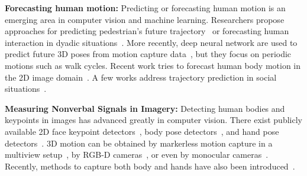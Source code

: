 \textbf{Forecasting human motion:}
Predicting or forecasting human motion is an emerging area in computer vision and machine learning. Researchers propose approaches for predicting pedestrian's future trajectory~\cite{kitani2012activity} or forecasting human interaction in dyadic situations~\cite{huang2014action}. More recently, deep neural network are used to predict future 3D poses from motion capture data~\cite{mnih2012conditional, Fragkiadaki_2015_ICCV, jain2016structural}, but they focus on periodic motions such as walk cycles. Recent work tries to forecast human body motion in the 2D image domain~\cite{walker2016uncertain, villegas2017learning}. A few works address trajectory prediction in social situations~\cite{helbing1995social, alahi2016social, gupta2018social}. 

%

\textbf{Measuring Nonverbal Signals in Imagery:} Detecting human bodies and keypoints in images has advanced greatly in computer vision. There exist publicly available 2D face keypoint detectors~\cite{baltruvsaitis2016openface}, body pose detectors~\cite{cao2017realtime, Wei2016, Newell-16}, and hand pose detectors~\cite{simon2017hand}. 3D motion can be obtained by markerless motion capture in a multiview setup~\cite{Gall-09,Liu-2013,Elhayek-15, joo2017panoptic, joo2018}, by RGB-D cameras~\cite{Shotton2011,Baak2011}, or even by monocular cameras~\cite{Ramakrishna2012,Bogo2016,martinez2017simple,zhou2017towards,Moreno-noguer2017,mehta2017monocular}. Recently, methods to capture both body and hands have also been introduced~\cite{MANO:SIGGRAPHASIA:2017,joo2018}. 

